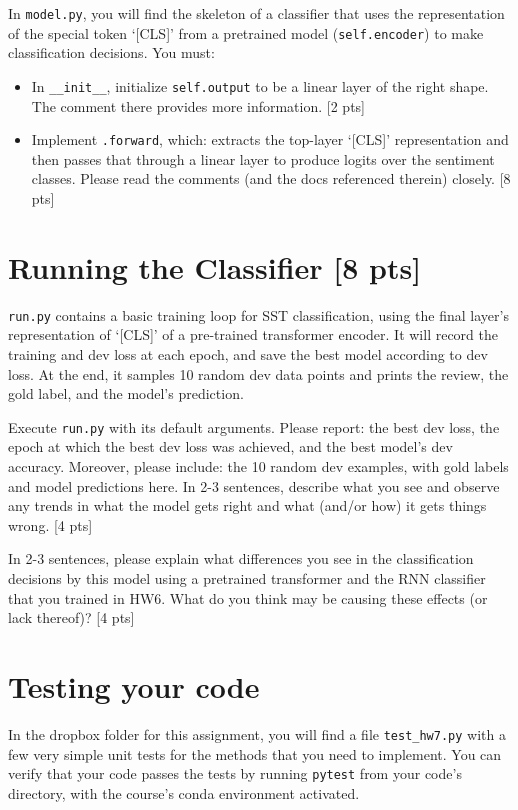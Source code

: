 \documentclass[11pt]{article}
\begin{document}
\vspace{2em}
  In \texttt{model.py}, you will find the skeleton of a classifier that uses the representation of the special token `[CLS]' from a pretrained model (\texttt{self.encoder}) to make classification decisions.  You must:
\begin{itemize}
  \item In \texttt{\_\_init\_\_}, initialize \texttt{self.output} to be a linear layer of the right shape.  The comment there provides more information. [2 pts]
  \item Implement \texttt{.forward}, which: extracts the top-layer `[CLS]' representation and then passes that through a linear layer to produce logits over the sentiment classes.  Please read the comments (and the docs referenced therein) closely. [8 pts]
\end{itemize}


\section{Running the Classifier [8 pts]}

\texttt{run.py} contains a basic training loop for SST classification, using the final layer's representation of `[CLS]' of a pre-trained transformer encoder. It will record the training and dev loss at each epoch, and save the best model according to dev loss.  At the end, it samples 10 random dev data points and prints the review, the gold label, and the model's prediction.

\vspace{2em}
 Execute \texttt{run.py} with its default arguments.  Please report: the best dev loss, the epoch at which the best dev loss was achieved, and the best model's dev accuracy.  Moreover, please include: the 10 random dev examples, with gold labels and model predictions here.  In 2-3 sentences, describe what you see and observe any trends in what the model gets right and what (and/or how) it gets things wrong. [4 pts]

\vspace{2em}
 In 2-3 sentences, please explain what differences you see in the classification decisions by this model using a pretrained transformer and the RNN classifier that you trained in HW6. What do you think may be causing these effects (or lack thereof)? [4 pts]

\section{Testing your code}

In the dropbox folder for this assignment, you will find a file \texttt{test\_hw7.py} with a few very simple unit tests for the methods that you need to implement.  You can verify that your code passes the tests by running \texttt{pytest} from your code's directory, with the course's conda environment activated.
\end{document}
